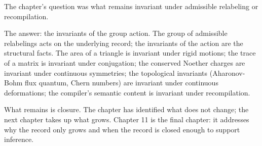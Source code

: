 \begin{bridge}

The chapter's question was what remains invariant under admissible
relabeling or recompilation.

The answer: the invariants of the group action. The group of
admissible relabelings acts on the underlying record; the
invariants of the action are the structural facts. The area
of a triangle is invariant under rigid motions; the trace of a
matrix is invariant under conjugation; the conserved Noether
charges are invariant under continuous symmetries; the
topological invariants (Aharonov-Bohm flux quantum, Chern numbers)
are invariant under continuous deformations; the compiler's
semantic content is invariant under recompilation.

What remains is closure. The chapter has identified what does not
change; the next chapter takes up what grows. Chapter 11 is the
final chapter: it addresses why the record only grows and when
the record is closed enough to support inference.

\end{bridge}

